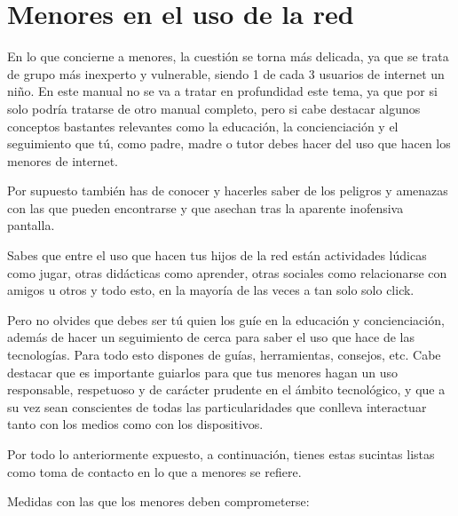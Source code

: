 \documentclass[
  spanish,
  a4paper,
  openany]{book}
\begin{document}
\hypertarget{menores-en-el-uso-de-la-red}{%
\section{Menores en el uso de la red}\label{menores-en-el-uso-de-la-red}}

En lo que concierne a menores, la cuestión se torna más delicada, ya que se trata de grupo más inexperto y vulnerable, siendo 1 de cada 3 usuarios de internet un niño. En este manual no se va a tratar en profundidad este tema, ya que por si solo podría tratarse de otro manual completo, pero si cabe destacar algunos conceptos bastantes relevantes como la educación, la concienciación y el seguimiento que tú, como padre, madre o tutor debes hacer del uso que hacen los menores de internet.

Por supuesto también has de conocer y hacerles saber de los peligros y amenazas con las que pueden encontrarse y que asechan tras la aparente inofensiva pantalla.

Sabes que entre el uso que hacen tus hijos de la red están actividades lúdicas como jugar, otras didácticas como aprender, otras sociales como relacionarse con amigos u otros y todo esto, en la mayoría de las veces a tan solo solo click.

Pero no olvides que debes ser tú quien los guíe en la educación y concienciación, además de hacer un seguimiento de cerca para saber el uso que hace de las tecnologías. Para todo esto dispones de guías, herramientas, consejos, etc. Cabe destacar que es importante guiarlos para que tus menores hagan un uso responsable, respetuoso y de carácter prudente en el ámbito tecnológico, y que a su vez sean conscientes de todas las particularidades que conlleva interactuar tanto con los medios como con los dispositivos.

Por todo lo anteriormente expuesto, a continuación, tienes estas sucintas listas como toma de contacto en lo que a menores se refiere.

Medidas con las que los menores deben comprometerse:
\end{document}
